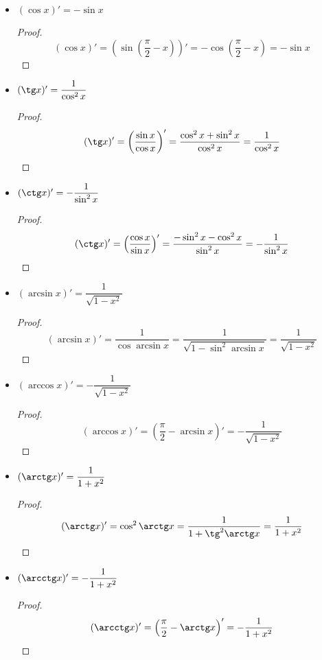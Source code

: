 \begin{itemize}
	\item $(\cos x)' = -\sin x$
	\begin{proof}
	\begin{equation*}
	(\cos x)' =
	(\sin \left( \frac\pi{2} - x \right))' =
	-\cos \left( \frac\pi{2} - x \right) =
	-\sin x
	\end{equation*}
	\end{proof}
	
	\item $(\tg x)' = \dfrac1{\cos^2 x}$
	\begin{proof}
	\begin{equation*}
	(\tg x)' =
	\left( \frac{\sin x}{\cos x} \right)' =
	\frac{\cos^2 x + \sin^2 x}{\cos^2 x} =
	\frac1{\cos^2 x}
	\end{equation*}
	\end{proof}
	
	\item $(\ctg x)' = -\dfrac1{\sin^2 x}$
	\begin{proof}
	\begin{equation*}
	(\ctg x)' =
	\left( \frac{\cos x}{\sin x} \right)' =
	\frac{-\sin^2 x - \cos^2 x}{\sin^2 x} =
	-\frac1{\sin^2 x}
	\end{equation*}
	\end{proof}
	
	\item $(\arcsin x)' = \dfrac1{\sqrt{1 - x^2}}$
	\begin{proof}
	\begin{equation*}
	(\arcsin x)' =
	\frac1{\cos \arcsin x} =
	\frac1{\sqrt{1 - \sin^2 \arcsin x}} =
	\frac1{\sqrt{1 - x^2}}
	\end{equation*}
	\end{proof}
	
	\item $(\arccos x)' = -\dfrac1{\sqrt{1 - x^2}}$
	\begin{proof}
	\begin{equation*}
	(\arccos x)' =
	\left( \frac\pi{2} - \arcsin x \right)' =
	-\frac1{\sqrt{1 - x^2}}
	\end{equation*}
	\end{proof}
	
	\item $(\arctg x)' = \dfrac1{1 + x^2}$
	\begin{proof}
	\begin{equation*}
	(\arctg x)' =
	\cos^2 \arctg x =
	\frac1{1 + \tg^2 \arctg x} =
	\frac1{1 + x^2}
	\end{equation*}
	\end{proof}
	
	\item $(\arcctg x)' = -\dfrac1{1 + x^2}$
	\begin{proof}
	\begin{equation*}
	(\arcctg x)' =
	\left( \frac\pi{2} - \arctg x \right)' =
	-\frac1{1 + x^2}
	\end{equation*}
	\end{proof}
\end{itemize}
